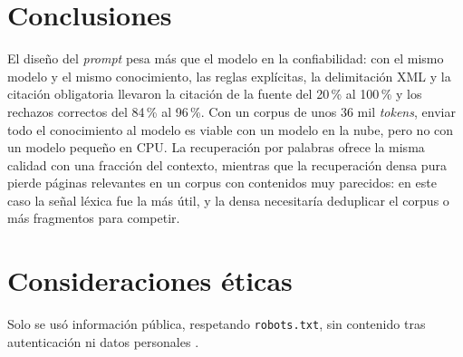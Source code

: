 \documentclass[journal]{IEEEtran}
\begin{document}
\section{Conclusiones}
El diseño del \textit{prompt} pesa más que el modelo en la confiabilidad: con el mismo modelo y el mismo conocimiento, las reglas explícitas, la delimitación XML y la citación obligatoria llevaron la citación de la fuente del 20\,\% al 100\,\% y los rechazos correctos del 84\,\% al 96\,\%. Con un corpus de unos 36 mil \textit{tokens}, enviar todo el conocimiento al modelo es viable con un modelo en la nube, pero no con un modelo pequeño en CPU. La recuperación por palabras ofrece la misma calidad con una fracción del contexto, mientras que la recuperación densa pura pierde páginas relevantes en un corpus con contenidos muy parecidos: en este caso la señal léxica fue la más útil, y la densa necesitaría deduplicar el corpus o más fragmentos para competir.

\section*{Consideraciones éticas}
Solo se usó información pública, respetando \texttt{robots.txt}, sin contenido tras autenticación ni datos personales \cite{ley1581}.



\end{document}
